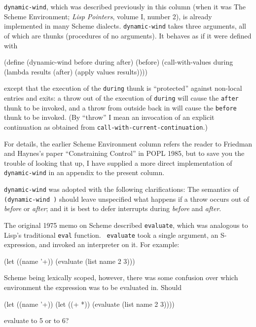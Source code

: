 {\tt dynamic-wind}, which was described previously in this column (when it
was The Scheme Environment; {\em Lisp Pointers}, volume I, number 2),
is already implemented in many Scheme dialects.  {\tt dynamic-wind}
takes three arguments, all of which are thunks (procedures of no arguments).
It behaves as if it were defined with
\begin{code}
    (define (dynamic-wind before during after)
      (before)
      (call-with-values during
        (lambda results
          (after)
          (apply values results))))
\end{code}
except that the execution of the {\tt during} thunk is ``protected''
against non-local entries and exits: a throw out of the execution
of {\tt during} will cause the {\tt after} thunk to be invoked, and a
throw from outside back in will cause the {\tt before} thunk to be
invoked.  (By ``throw'' I mean an invocation of an explicit
continuation as obtained from {\tt call-with-current-continuation}.)

For details, the earlier Scheme Environment column refers the reader
to Friedman and Haynes's paper ``Constraining Control'' in POPL 1985,
but to save you the trouble of looking that up, I have supplied a more
direct implementation of {\tt dynamic-wind} in an appendix to the
present column.

{\tt dynamic-wind} was adopted with the following clarifications: The
semantics of {\tt(dynamic-wind   )}
should leave unspecified what happens if a throw occurs out of {\em
before} or {\em after}\/; and it is best to defer interrupts during {\em
before} and {\em after}.




The original 1975 memo on Scheme described {\tt evaluate},
which was analogous to Lisp's traditional {\tt eval} function.  {\tt
evaluate} took a single argument, an S-expression, and invoked an
interpreter on it.  For example:
\begin{code}
    (let ((name '+)) (evaluate (list name 2 3)))
\end{code}
Scheme being lexically scoped, however, there was some confusion over
which environment the expression was to be evaluated in.  Should
\begin{code}
    (let ((name '+))
      (let ((+ *))
        (evaluate (list name 2 3))))
\end{code}
evaluate to 5 or to 6?

